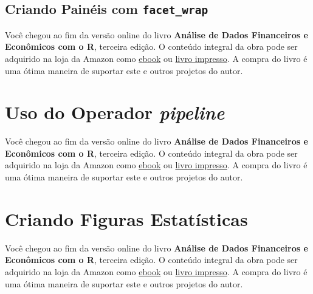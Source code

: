 \documentclass[
  11pt,
]{book}
\newenvironment{pleasebuyit}
{\begin{noteblock}
		
	} {\end{noteblock}}
\begin{document}
\hypertarget{facets}{%
\subsection{\texorpdfstring{Criando Painéis com \texttt{facet\_wrap}}{Criando Painéis com facet\_wrap}}\label{facets}}

\begin{pleasebuyit}
Você chegou ao fim da versão online do livro \textbf{Análise de Dados
Financeiros e Econômicos com o R}, terceira edição. O conteúdo integral
da obra pode ser adquirido na loja da Amazon como
\href{https://www.amazon.com.br/dp/B08WNC27ZY}{ebook} ou
\href{https://www.amazon.com/dp/B08WP8CCDB}{livro impresso}. A compra do
livro é uma ótima maneira de suportar este e outros projetos do autor.
\end{pleasebuyit}

\hypertarget{uso-do-operador-pipeline}{%
\section{\texorpdfstring{Uso do Operador \emph{pipeline}}{Uso do Operador pipeline}}\label{uso-do-operador-pipeline}}

\begin{pleasebuyit}
Você chegou ao fim da versão online do livro \textbf{Análise de Dados
Financeiros e Econômicos com o R}, terceira edição. O conteúdo integral
da obra pode ser adquirido na loja da Amazon como
\href{https://www.amazon.com.br/dp/B08WNC27ZY}{ebook} ou
\href{https://www.amazon.com/dp/B08WP8CCDB}{livro impresso}. A compra do
livro é uma ótima maneira de suportar este e outros projetos do autor.
\end{pleasebuyit}

\hypertarget{criando-figuras-estatuxedsticas}{%
\section{Criando Figuras Estatísticas}\label{criando-figuras-estatuxedsticas}}

\begin{pleasebuyit}
Você chegou ao fim da versão online do livro \textbf{Análise de Dados
Financeiros e Econômicos com o R}, terceira edição. O conteúdo integral
da obra pode ser adquirido na loja da Amazon como
\href{https://www.amazon.com.br/dp/B08WNC27ZY}{ebook} ou
\href{https://www.amazon.com/dp/B08WP8CCDB}{livro impresso}. A compra do
livro é uma ótima maneira de suportar este e outros projetos do autor.
\end{pleasebuyit}
\end{document}

